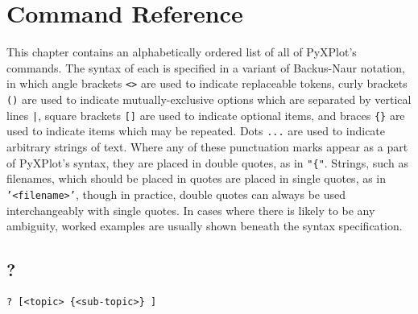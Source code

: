 %
%
%
%
%



\chapter{Command Reference}
\label{ch:reference}

This chapter contains an alphabetically ordered list of all of PyXPlot's
commands. The syntax of each is specified in a variant of Backus-Naur notation,
in which angle brackets {\tt <>} are used to indicate replaceable tokens, curly
brackets {\tt ()} are used to indicate mutually-exclusive options which are
separated by vertical lines {\tt |}, square brackets {\tt []} are used to
indicate optional items, and braces {\tt \{\}} are used to indicate items which
may be repeated. Dots {\tt ...} are used to indicate arbitrary strings of text.
Where any of these punctuation marks appear as a part of PyXPlot's syntax, they
are placed in double quotes, as in {\tt "\{"}. Strings, such as filenames,
which should be placed in quotes are placed in single quotes, as in {\tt
'<filename>'}, though in practice, double quotes can always be used
interchangeably with single quotes. In cases where there is likely to be any
ambiguity, worked examples are usually shown beneath the syntax specification.

\section{?}

\begin{verbatim}
? [<topic> {<sub-topic>} ]
\end{verbatim}

